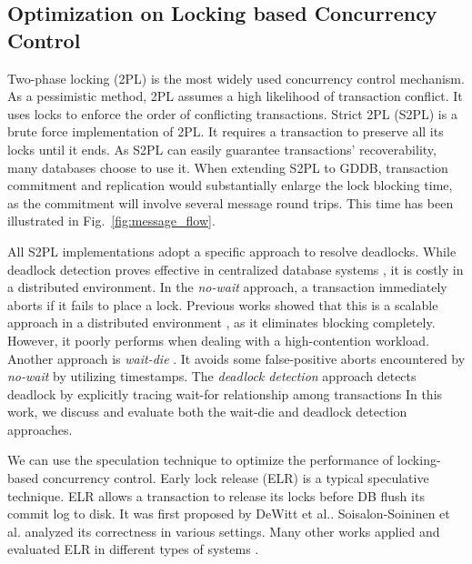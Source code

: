 \documentclass[conference]{IEEEtran}
\begin{document}
\subsection{Optimization on Locking based Concurrency Control}
Two-phase locking (2PL) is the most widely used concurrency control mechanism.
As a pessimistic method, 2PL assumes a high likelihood of transaction conflict.
It uses locks to enforce the order of conflicting transactions.
Strict 2PL (S2PL) is a brute force implementation of 2PL.
It requires a transaction to preserve all its locks until it ends.
As S2PL can easily guarantee transactions' recoverability, many databases choose to use it.
When extending S2PL to GDDB, transaction commitment and replication would substantially enlarge the lock blocking time,
as the commitment will involve several message round trips. 
This time has been illustrated in Fig.~\ref{fig:message_flow}.

All S2PL implementations adopt a specific approach to resolve deadlocks.
While deadlock detection proves effective in centralized database systems \cite{MySQL}\cite{PostgreSQL}, it is costly in a distributed environment.
In the \emph{no-wait}
\cite{EvaluationOfCC:journals/pvldb/HardingAPS17}
approach, a transaction immediately aborts if it fails to place a lock.
Previous works showed that this is a scalable approach in a distributed environment \cite{EvaluationCC1000Cores:journals/pvldb/YuBPDS14}\cite{EvaluationOfCC:journals/pvldb/HardingAPS17},
as it eliminates blocking completely.
However, it poorly performs when dealing with a high-contention workload.
Another approach is \emph{wait-die} \cite{LockNoWait:journals/csur/BernsteinG81}.
It avoids some false-positive aborts encountered by \emph{no-wait} by utilizing timestamps.
The \emph{deadlock detection} approach \cite{LockCC:conf/ds/GrayLPT76} detects deadlock by explicitly tracing wait-for relationship among transactions
In this work, we discuss and evaluate both the wait-die and deadlock detection approaches.


We can use the speculation technique to optimize the performance of locking-based concurrency control.
Early lock release (ELR)
\cite{EfficientLocking:conf/vldb/KimuraGK12}
\cite{ELR:dewitt_implementation_1984}
\cite{PS2PL:conf/icdt/Soisalon-SoininenY95}
\cite{Aether:journals/pvldb/JohnsonPSAA10}
\cite{Actor-Oriented-DB:conf/icde/Bernstein18}
is a typical speculative technique.
ELR allows a transaction to release its locks before DB flush its commit log to disk.
It was first proposed by DeWitt et al.\cite{ELR:dewitt_implementation_1984}.
Soisalon-Soininen et al. \cite{PS2PL:conf/icdt/Soisalon-SoininenY95} analyzed its correctness in various settings.
Many other works applied and evaluated ELR in different types of systems
\cite{EfficientLocking:conf/vldb/KimuraGK12}
\cite{Aether:journals/pvldb/JohnsonPSAA10}.
\end{document}
